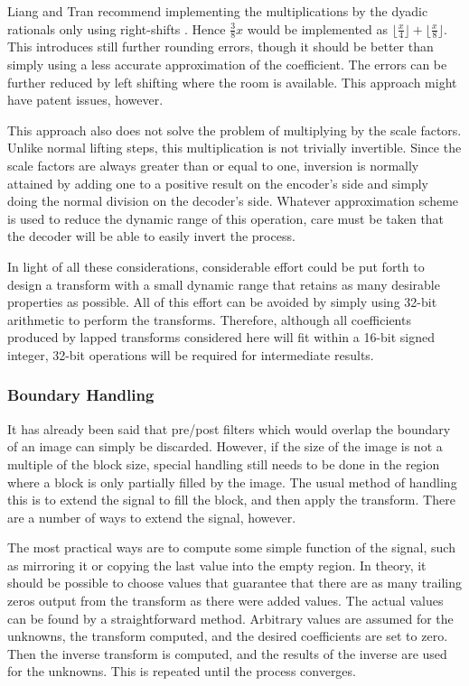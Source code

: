 \documentclass[11pt,letterpaper]{article}
\begin{document}
Liang and Tran recommend implementing the multiplications by the dyadic
 rationals only using right-shifts \cite{LT01}.
Hence $\frac{3}{8}x$ would be implemented as
 $\lfloor\frac{x}{4}\rfloor+\lfloor\frac{x}{8}\rfloor$.
This introduces still further rounding errors, though it should be better than
 simply using a less accurate approximation of the coefficient.
The errors can be further reduced by left shifting where the room is available.
This approach might have patent issues, however.

This approach also does not solve the problem of multiplying by the scale
 factors.
Unlike normal lifting steps, this multiplication is not trivially invertible.
Since the scale factors are always greater than or equal to one, inversion is
 normally attained by adding one to a positive result on the encoder's side
 and simply doing the normal division on the decoder's side.
Whatever approximation scheme is used to reduce the dynamic range of this
 operation, care must be taken that the decoder will be able to easily invert
 the process.

In light of all these considerations, considerable effort could be put forth to
 design a transform with a small dynamic range that retains as many desirable
 properties as possible.
All of this effort can be avoided by simply using 32-bit arithmetic to perform
 the transforms.
Therefore, although all coefficients produced by lapped transforms considered
 here will fit within a 16-bit signed integer, 32-bit operations will be
 required for intermediate results.

\subsubsection{Boundary Handling}

It has already been said that pre/post filters which would overlap the boundary
 of an image can simply be discarded.
However, if the size of the image is not a multiple of the block size, special
 handling still needs to be done in the region where a block is only partially
 filled by the image.
The usual method of handling this is to extend the signal to fill the block,
 and then apply the transform.
There are a number of ways to extend the signal, however.

The most practical ways are to compute some simple function of the signal, such
 as mirroring it or copying the last value into the empty region.
In theory, it should be possible to choose values that guarantee that there are
 as many trailing zeros output from the transform as there were added values.
The actual values can be found by a straightforward method.
Arbitrary values are assumed for the unknowns, the transform computed, and the
 desired coefficients are set to zero.
Then the inverse transform is computed, and the results of the inverse are used
 for the unknowns.
This is repeated until the process converges.
\end{document}
